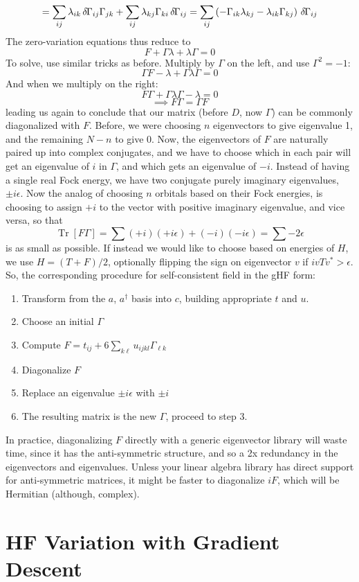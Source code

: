 \documentclass[a4paper,11pt]{article}
\DeclareMathOperator{\Tr}{Tr}
\newcommand{\9}{\,\,\,\,\,\,\,\,\,}
\newcommand{\ichg}{\,\delta\hspace{-0.3mm}}
\begin{document}
$$ = \sum_{ij}\lambda_{ik} \ichg\Gamma_{ij}\Gamma_{jk} + \sum_{ij}\lambda_{kj} \Gamma_{ki}\ichg\Gamma_{ij} = \sum_{ij}\left( -\Gamma_{ik}\lambda_{kj} - \lambda_{ik} \Gamma_{kj}\right)\ichg\Gamma_{ij}$$
The zero-variation equations thus reduce to
$$F + \Gamma \lambda + \lambda \Gamma = 0$$
To solve, use similar tricks as before. Multiply by $\Gamma$ on the left, and use $\Gamma^2 = -1$:
$$\Gamma F -\lambda + \Gamma \lambda \Gamma = 0$$
And when we multiply on the right:
$$F\Gamma  + \Gamma \lambda \Gamma - \lambda = 0$$
$$\implies F\Gamma = \Gamma F$$
leading us again to conclude that our matrix (before $D$, now $\Gamma$) can be commonly diagonalized with $F$. Before, we were choosing $n$ eigenvectors to give eigenvalue 1, and the remaining $N-n$ to give 0. Now, the eigenvectors of $F$ are naturally paired up into complex conjugates, and we have to choose which in each pair will get an eigenvalue of $i$ in $\Gamma$, and which gets an eigenvalue of $-i$. Instead of having a single real Fock energy, we have two conjugate purely imaginary eigenvalues, $\pm i\epsilon$. Now the analog of choosing $n$ orbitals based on their Fock energies, is choosing to assign $+i$ to the vector with positive imaginary eigenvalue, and vice versa, so that
$$\Tr[F\Gamma] = \sum (+i)(+i\epsilon) + (-i)(-i\epsilon) = \sum -2\epsilon$$
is as small as possible. If instead we would like to choose based on energies of $H$, we use $H = (T+F)/2$, optionally flipping the sign on eigenvector $v$ if $ivTv^* > \epsilon$. So, the corresponding procedure for self-consistent field in the gHF form:
\begin{enumerate}
	\item Transform from the $a$, $a^\dagger$ basis into $c$, building appropriate $t$ and $u$.
	\item Choose an initial $\Gamma$
	\item Compute $F = t_{ij} + 6\sum_{k\ell}u_{ijkl}\Gamma_{\ell k}$
	\item Diagonalize $F$
	\item Replace an eigenvalue $\pm i \epsilon$ with $\pm i$
	\item The resulting matrix is the new $\Gamma$, proceed to step 3.
\end{enumerate}
In practice, diagonalizing $F$ directly with a generic eigenvector library will waste time, since it has the anti-symmetric structure, and so a 2x redundancy in the eigenvectors and eigenvalues. Unless your linear algebra library has direct support for anti-symmetric matrices, it might be faster to diagonalize $iF$, which will be Hermitian (although, complex).

\section{HF Variation with Gradient Descent}
\end{document}

